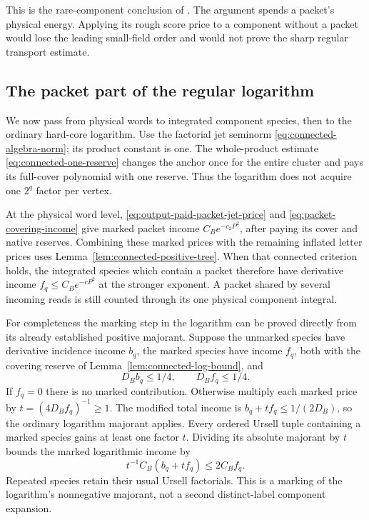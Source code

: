 \documentclass[11pt,reqno]{amsart}
\numberwithin{equation}{section}
\theoremstyle{definition}
\theoremstyle{remark}
\begin{document}
This is the rare-component conclusion of
\cite[Proposition~31.3, pp.~193--194]{Main}. The argument spends
a packet's physical energy. Applying its rough score price
to a component without a packet would lose the leading
small-field order and would not prove the sharp regular
transport estimate.

\subsection{The packet part of the regular logarithm}

We now pass from physical words to integrated component species,
then to the ordinary hard-core logarithm. Use the factorial
jet seminorm \eqref{eq:connected-algebra-norm}; its product
constant is one. The whole-product estimate
\eqref{eq:connected-one-reserve} changes the anchor once for
the entire cluster and pays its full-cover polynomial with
one reserve. Thus the logarithm does not acquire one
\(2^q\) factor per vertex.

At the physical word level,
\eqref{eq:output-paid-packet-jet-price} and
\eqref{eq:packet-covering-income} give marked packet income
\(C_Be^{-c_2P^2}\), after paying its cover and native reserves.
Combining these marked prices with the remaining inflated
letter prices uses Lemma~\ref{lem:connected-positive-tree}.
When that connected criterion holds, the integrated species
which contain a packet therefore have derivative income
\(f_q\le C_Be^{-cP^2}\) at the stronger exponent. A packet
shared by several incoming reads is still counted through
its one physical component integral.

For completeness the marking step in the logarithm can be
proved directly from its already established positive
majorant. Suppose the unmarked species have derivative
incidence income \(b_q\), the marked species have income
\(f_q\), both with the covering reserve of
Lemma~\ref{lem:connected-log-bound}, and
\begin{equation}
                         D_Bb_q\le1/4,\qquad D_Bf_q\le1/4.
 \label{eq:output-marked-log-criterion}
\end{equation}
If \(f_q=0\) there is no marked contribution. Otherwise
multiply each marked price by
\(t=(4D_Bf_q)^{-1}\ge1\). The modified total income is
\(b_q+tf_q\le1/(2D_B)\), so the ordinary logarithm majorant
applies. Every ordered Ursell tuple containing a marked
species gains at least one factor \(t\). Dividing its absolute
majorant by \(t\) bounds the marked logarithmic income by
\begin{equation}
                   t^{-1}C_B(b_q+tf_q)\le2C_Bf_q.
 \label{eq:output-marked-log-price}
\end{equation}
Repeated species retain their usual Ursell factorials. This
is a marking of the logarithm's nonnegative majorant, not
a second distinct-label component expansion.
\end{document}
